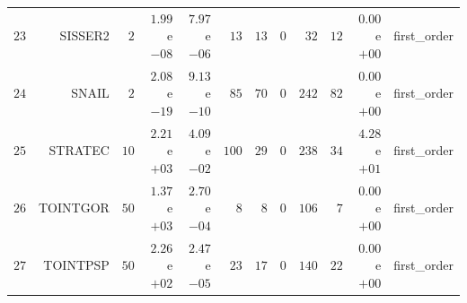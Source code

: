 \begin{longtable}{rrrrrrrrrrrr}
  \(    23\) & SISSER2 & \(     2\) & \( 1.99\)e\(-08\) & \( 7.97\)e\(-06\) & \(    13\) & \(    13\) & \(     0\) & \(    32\) & \(    12\) & \( 0.00\)e\(+00\) & first\_order \\
  \(    24\) & SNAIL & \(     2\) & \( 2.08\)e\(-19\) & \( 9.13\)e\(-10\) & \(    85\) & \(    70\) & \(     0\) & \(   242\) & \(    82\) & \( 0.00\)e\(+00\) & first\_order \\
  \(    25\) & STRATEC & \(    10\) & \( 2.21\)e\(+03\) & \( 4.09\)e\(-02\) & \(   100\) & \(    29\) & \(     0\) & \(   238\) & \(    34\) & \( 4.28\)e\(+01\) & first\_order \\
  \(    26\) & TOINTGOR & \(    50\) & \( 1.37\)e\(+03\) & \( 2.70\)e\(-04\) & \(     8\) & \(     8\) & \(     0\) & \(   106\) & \(     7\) & \( 0.00\)e\(+00\) & first\_order \\
  \(    27\) & TOINTPSP & \(    50\) & \( 2.26\)e\(+02\) & \( 2.47\)e\(-05\) & \(    23\) & \(    17\) & \(     0\) & \(   140\) & \(    22\) & \( 0.00\)e\(+00\) & first\_order \\\hline
\end{longtable}
